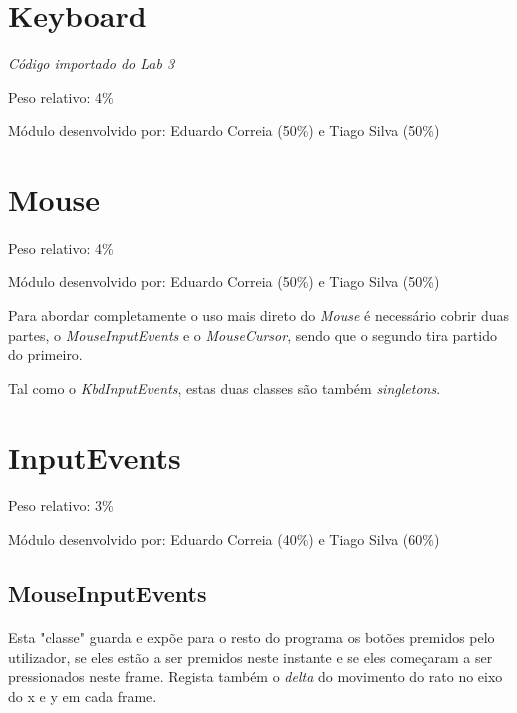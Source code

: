\documentclass{report}
\begin{document}
\section{Keyboard}

\textit{Código importado do Lab 3}\footnotemark[\value{footnote}]\newline

Peso relativo: 4\%

Módulo desenvolvido por: Eduardo Correia (50\%) e Tiago Silva (50\%)

\section{Mouse}

\paragraph{}
Peso relativo: 4\%

Módulo desenvolvido por: Eduardo Correia (50\%) e Tiago Silva (50\%)

Para abordar completamente o uso mais direto do \textit{Mouse} é necessário cobrir duas partes, o \textit{MouseInputEvents} e o \textit{MouseCursor}, sendo que o segundo tira partido do primeiro.

Tal como o \textit{KbdInputEvents}, estas duas classes são também \textit{singletons}.


\section{InputEvents}

\paragraph{}
Peso relativo: 3\%

Módulo desenvolvido por: Eduardo Correia (40\%) e Tiago Silva (60\%)

\subsection{MouseInputEvents}

\paragraph{}
Esta "classe" guarda e expõe para o resto do programa os botões premidos pelo utilizador, se eles estão a ser premidos neste instante e se eles começaram a ser pressionados neste frame. Regista também o \textit{delta} do movimento do rato no eixo do x e y em cada frame.
\end{document}
